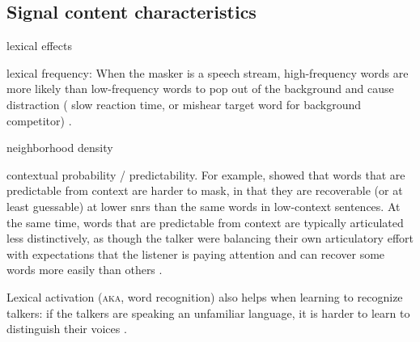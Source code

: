 
\subsection{Signal content characteristics}
\begin{itm}
	\item{lexical effects \citep{HoenEtAl2007, BoulengerEtAl2010, BrouwerEtAl2012}}
	\item{lexical frequency: When the masker is a speech stream, high-frequency words are more likely than low-frequency words to pop out of the background and cause distraction (\ie{} slow reaction time, or mishear target word for background competitor) \citep{BoulengerEtAl2010}.}
	\item{neighborhood density}
	\item{contextual probability / predictability.  For example, \citet{LewisEtAl1988} showed that words that are predictable from context are harder to mask, in that they are recoverable (or at least guessable) at lower \ac{snr}s than the same words in low-context sentences.  At the same time, words that are predictable from context are typically articulated less distinctively, as though the talker were balancing their own articulatory effort with expectations that the listener is paying attention and can recover some words more easily than others \citep{Wright2004}.  }
	\item{Lexical activation (\textsc{aka}, word recognition) also helps when learning to recognize talkers: if the talkers are speaking an unfamiliar language, it is harder to learn to distinguish their voices \citep{PerrachioneWong2007}.}
\end{itm}


